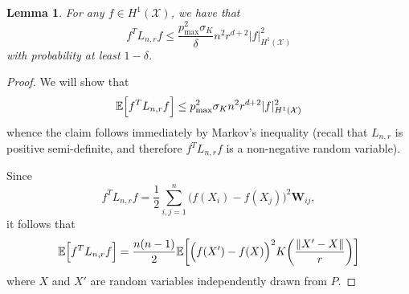 \documentclass{article}
\newcommand{\1}{\mathbf{1}}
\newcommand{\Lap}{L}
\newcommand{\Xset}{\mathcal{X}}
\newcommand{\Ebb}{\mathbb{E}}
\theoremstyle{alden}
\theoremstyle{aldenthm}
\newtheorem{lemma}{Lemma}
\theoremstyle{definition}
\theoremstyle{remark}
\begin{document}
\begin{lemma}
	\label{lem:first_order_graph_sobolev_seminorm}
	For any $f \in H^1(\Xset)$, we have that
	\begin{equation}
	f^T \Lap_{n,r} f \leq \frac{p_{\max}^2 \sigma_K}{\delta} n^2 r^{d + 2} |f|_{H^1(\Xset)}^2
	\end{equation}
	with probability at least $1 - \delta$.
\end{lemma}
\begin{proof}
	We will show that
	\begin{equation*}
	\Ebb\Bigl[f^T \Lap_{n,r} f\Bigr] \leq p_{\max}^2 \sigma_K n^2 r^{d + 2} |f|_{H^1(\Xset)}^2
	\end{equation*}
	whence the claim follows immediately by Markov's inequality (recall that $\Lap_{n,r}$ is positive semi-definite, and therefore $f^T \Lap_{n,r} f$ is a non-negative random variable).
	
	Since
	\begin{equation*}
	f^T \Lap_{n,r} f = \frac{1}{2}\sum_{i, j = 1}^{n} \bigl(f(X_i) - f(X_j)\bigr)^2 \mathbf{W}_{ij},
	\end{equation*}
	it follows that
	\begin{equation}
	\label{pf:first_order_graph_sobolev_seminorm_1}
	\Ebb\Bigl[f^T \Lap_{n,r} f\Bigr] = \frac{n(n - 1)}{2} \Ebb\biggl[\Bigl(f(X') - f(X)\Bigr)^2 K\biggl(\frac{\|X' - X\|}{r}\biggr)\biggr]
	\end{equation}
	where $X$ and $X'$ are random variables independently drawn from $P$. 
	

\end{proof}
\end{document}
